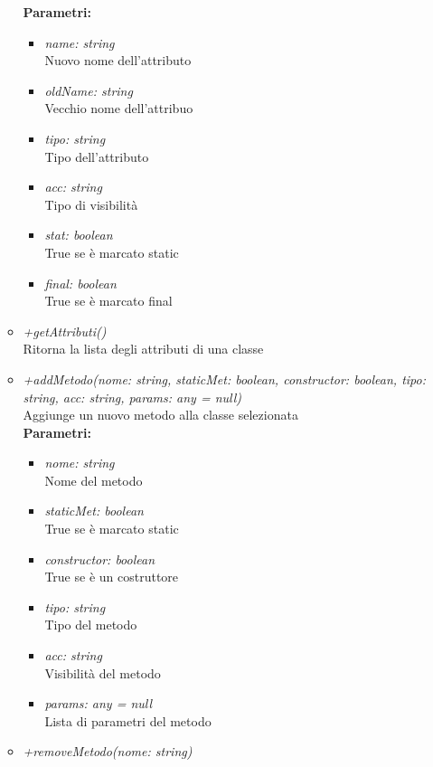 \begin{itemize}
\begin{itemize}
    		\textbf{Parametri:}
    		\begin{itemize}
    			\item \emph{name: string}\\
    			Nuovo nome dell'attributo
    			\item \emph{oldName: string}\\
    			Vecchio nome dell'attribuo
    			\item \emph{tipo: string}\\
    			Tipo dell'attributo
    			\item \emph{acc: string}\\
    			Tipo di visibilità
    			\item \emph{stat: boolean}\\
    			True se è marcato static
    			\item \emph{final: boolean}\\
    			True se è marcato final
    		\end{itemize}
    		\item \emph{+getAttributi()}\\
    		Ritorna la lista degli attributi di una classe
    		\item \emph{+addMetodo(nome: string, staticMet: boolean, constructor: boolean, tipo: string, acc: string, params: any = null)}\\
    		Aggiunge un nuovo metodo alla classe selezionata\\
    		\textbf{Parametri:}
    		\begin{itemize}
    			\item \emph{nome: string}\\
    			Nome del metodo
    			\item \emph{staticMet: boolean}\\
    			True se è marcato static
    			\item \emph{constructor: boolean}\\
    			True se è un costruttore
    			\item \emph{tipo: string}\\
    			Tipo del metodo
    			\item \emph{acc: string}\\
    			Visibilità del metodo
    			\item \emph{params: any = null}\\
    			Lista di parametri del metodo
    		\end{itemize}
    		\item \emph{+removeMetodo(nome: string)}\\

\end{itemize}
\end{itemize}

